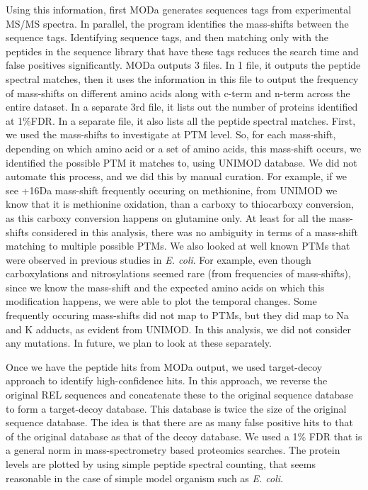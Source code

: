 \documentclass[12pt]{article}
\begin{document}
Using this information, first MODa generates sequences tags from experimental MS/MS spectra. In parallel,  the program identifies the mass-shifts between the sequence tags. Identifying sequence tags, and then matching only with the peptides in the sequence library that have these tags reduces the search time and false positives significantly. MODa outputs 3 files. In 1 file, it outputs the peptide spectral matches, then it uses the information in this file to output the frequency of mass-shifts on different amino acids along with c-term and n-term across the entire dataset. In a separate 3rd file, it lists out the number of proteins identified at 1\%FDR. In a separate file, it also lists all the peptide spectral matches. First, we used the mass-shifts to investigate at PTM level. So, for each mass-shift, depending on which amino acid or a set of amino acids, this mass-shift occurs, we identified the possible PTM it matches to, using UNIMOD database. We did not automate this process, and we did this by manual curation. For example, if we see +16Da mass-shift frequently occuring on methionine, from UNIMOD we know that it is methionine oxidation, than a carboxy to thiocarboxy conversion, as this carboxy conversion happens on glutamine only. At least for all the mass-shifts considered in this analysis, there was no ambiguity in terms of a mass-shift matching to multiple possible PTMs. We also looked at well known PTMs that were observed in previous studies in \emph{E. coli}. For example, even though carboxylations and nitrosylations seemed rare (from frequencies of mass-shifts), since we know the mass-shift and the expected amino acids on which this modification happens, we were able to plot the temporal changes. Some frequently occuring mass-shifts did not map to PTMs, but they did map to Na and K adducts, as evident from UNIMOD. In this analysis, we did not consider any mutations. In future, we plan to look at these separately.

Once we have the peptide hits from MODa output, we used target-decoy approach \cite{EliasGygi2007} to identify high-confidence hits. In this approach, we reverse the original REL sequences and concatenate these to the original sequence database to form a target-decoy database. This database is twice the size of the original sequence database. The idea is that there are as many false positive hits to that of the original database as that of the decoy database. We used a 1\% FDR that is a general norm in mass-spectrometry based proteomics searches. The protein levels are plotted by using simple peptide spectral counting, that seems reasonable in the case of simple model organism such as \emph{E. coli}.
\end{document}
